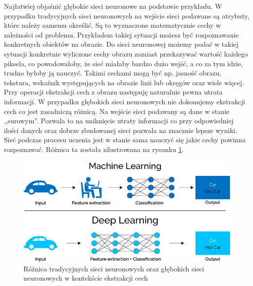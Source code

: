 Najłatwiej objaśnić głębokie sieci neuronowe na podstawie przykładu. W przypadku tradycyjnych sieci neuronowych na wejście sieci podawane są atrybuty, które należy samemu określić. Są to wyznaczone matematycznie cechy w zależności od problemu. Przykładem takiej sytuacji możesz być rozpoznawanie konkretnych obiektów na obrazie. Do sieci neuronowej możemy podać w takiej sytuacji konkretnie wyliczone cechy obrazu zamiast przekazywać wartość każdego piksela, co powodowałoby, że sieć miałaby bardzo dużo wejść, a co za tym idzie, trudno byłoby ją nauczyć. Takimi cechami mogą być np. jasność obrazu, tekstura, wskaźnik występujących na obrazie linii lub okręgów oraz wiele więcej. Przy operacji ekstrakcji cech z obrazu następuję naturalnie pewna utrata informacji. W przypadku głębokich sieci neuronowych nie dokonujemy ekstrakcji cech co jest zasadniczą różnicą. Na wejście sieci podawany są dane w stanie ,,surowym''. Pozwala to na uniknięcie utraty informacji co przy odpowiedniej ilości danych oraz dobrze zbudowanej sieci pozwala na znacznie lepsze wyniki. Sieć podczas procesu uczenia jest w stanie sama nauczyć się jakie cechy powinna rozpoznawać. Różnica ta została zilustrowana na rysunku \ref{dnnDiff}.

\begin{figure}[ht!]
\centering
\includegraphics[scale=0.5]{res/dnn1.png}
\caption[Caption for LOF]{Różnica tradycyjnych sieci neuronowych oraz głębokich sieci neuronowych w kontekście ekstrakcji cech\label{dnnDiff}\footnotemark} 
\end{figure}

